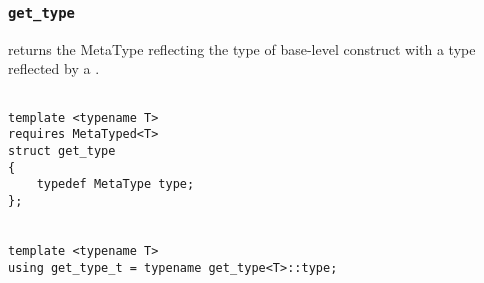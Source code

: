 
\subsubsection{\texttt{get\_type}}

returns the MetaType reflecting the type of base-level construct with a type reflected by a .

\begin{verbatim}

template <typename T>
requires MetaTyped<T>
struct get_type
{
	typedef MetaType type;
};


template <typename T>
using get_type_t = typename get_type<T>::type;

\end{verbatim}
